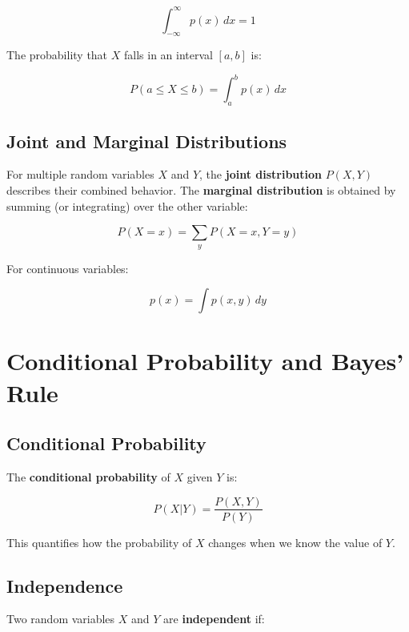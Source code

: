 \begin{equation}
\int_{-\infty}^{\infty} p(x) \, dx = 1
\end{equation}

The probability that $X$ falls in an interval $[a, b]$ is:

\begin{equation}
P(a \leq X \leq b) = \int_a^b p(x) \, dx
\end{equation}

\subsection{Joint and Marginal Distributions}

For multiple random variables $X$ and $Y$, the \textbf{joint distribution} $P(X, Y)$ describes their combined behavior. The \textbf{marginal distribution} is obtained by summing (or integrating) over the other variable:

\begin{equation}
P(X=x) = \sum_{y} P(X=x, Y=y)
\end{equation}

For continuous variables:

\begin{equation}
p(x) = \int p(x, y) \, dy
\end{equation}

\section{Conditional Probability and Bayes' Rule}
\label{sec:conditional-probability}

\subsection{Conditional Probability}

The \textbf{conditional probability} of $X$ given $Y$ is:

\begin{equation}
P(X|Y) = \frac{P(X, Y)}{P(Y)}
\end{equation}

This quantifies how the probability of $X$ changes when we know the value of $Y$.

\subsection{Independence}

Two random variables $X$ and $Y$ are \textbf{independent} if:

